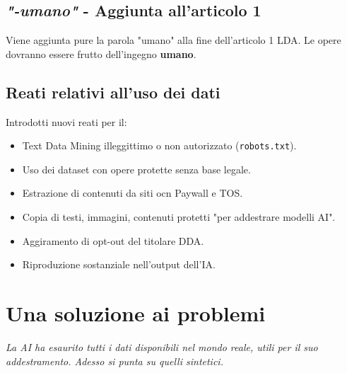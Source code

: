 \subsection{\textit{"-umano"} - Aggiunta all'articolo 1}
Viene aggiunta pure la parola "umano" alla fine dell'articolo 1 LDA. Le opere dovranno essere frutto dell'ingegno \textbf{umano}.

\subsection{Reati relativi all'uso dei dati}
Introdotti nuovi reati per il:
\begin{itemize}
	\item Text Data Mining illeggittimo o non autorizzato (\verb|robots.txt|).
	\item Uso dei dataset con opere protette senza base legale.
	\item Estrazione di contenuti da siti ocn Paywall e TOS.
	\item Copia di testi, immagini, contenuti protetti "per addestrare modelli AI".
	\item Aggiramento di opt-out del titolare DDA.
	\item Riproduzione sostanziale nell'output dell'IA.
\end{itemize}

\section{Una soluzione ai problemi}
\textit{La AI ha esaurito tutti i dati disponibili nel mondo reale, utili per il suo addestramento. Adesso si punta su quelli sintetici.}